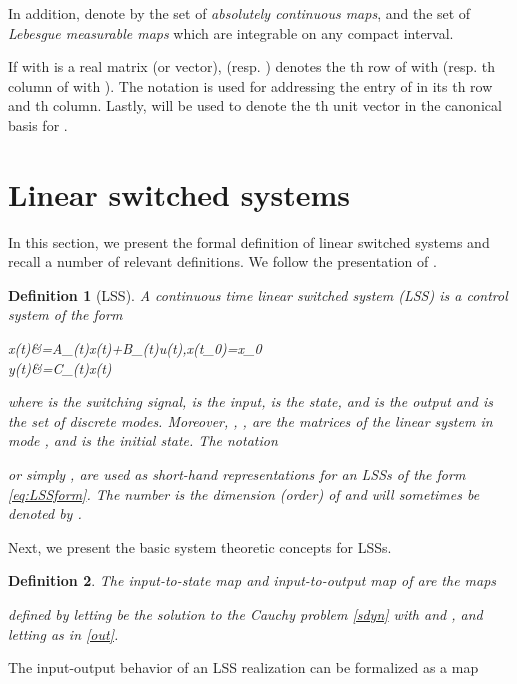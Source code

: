 \documentclass[journal]{IEEEtran}
\newtheorem{Definition}{Definition}
\begin{document}
In addition, denote by  the set of \emph{absolutely continuous maps}, and  the set of \emph{Lebesgue measurable maps} which are integrable on any compact interval.

If  with  is a real matrix (or vector),  (resp. ) denotes the th row of  with  (resp. th column of  with ). The notation  is used for addressing the entry of  in its th row and th column. Lastly,  will be used to denote the th unit vector in the canonical basis for .

\section{Linear switched systems}
\label{sect:lin_switch_def}

In this section, we present the formal definition of linear switched systems and recall a number of relevant definitions. We follow the presentation of \cite{MP:BigArticlePartI,petreczky2013}.

\begin{Definition}[LSS] \label{LSS}
	A continuous time linear switched system (LSS) is a control system of the form
	 
			x(t)&=A_{\sigma(t)}x(t)+B_{\sigma(t)}u(t),\quad x(t_0)=x_0\label{sdyn} \\
			y(t)&=C_{\sigma(t)}x(t)\label{out} 
		
	where  is the switching signal,  is the input,  is the state, and  is the output and  is the set of discrete modes. Moreover, , ,  are the matrices of the linear system in mode , and  is the initial state. The notation
	
	or simply , are used as short-hand representations for an LSSs of the form \eqref{eq:LSSform}. The number  is the \emph{dimension (order) of } and will sometimes be denoted by .
\end{Definition}

Next, we present the basic system theoretic concepts for LSSs.

\begin{Definition}\label{def:stateandoutput}
The \emph{input-to-state} map  and \emph{input-to-output} map  of  are the maps 
	
	defined by letting  be the solution to the Cauchy problem \eqref{sdyn} with  and , and letting  as in \eqref{out}.
\end{Definition}

The input-output behavior of an LSS realization can be formalized as a map
\end{document}
